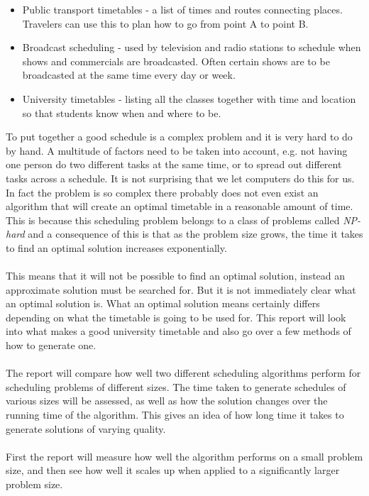 \documentclass[titlepage,a4paper]{article}
\begin{document}
\begin{itemize}

  \item Public transport timetables - a list of times and routes connecting places. Travelers can use this to plan how to go from point A to point B.
  \item Broadcast scheduling - used by television and radio stations to schedule when shows and commercials are broadcasted. Often certain shows are to be broadcasted at the same time every day or week.
  \item University timetables - listing all the classes together with time and location so that students know when and where to be. 

\end{itemize}
To put together a good schedule is a complex problem and it is very hard to do by hand. A multitude of factors need to be taken into account, e.g. not having one person do two different tasks at the same time, or to spread out different tasks across a schedule. It is not surprising that we let computers do this for us. In fact the problem is so complex there probably does not even exist an algorithm that will create an optimal timetable in a reasonable amount of time. This is because this scheduling problem belongs to a class of problems called \emph{NP-hard}\cite{guidedSearch09}  and a consequence of this is that as the problem size grows, the time it takes to find an optimal solution increases exponentially. \\\\
This means that it will not be possible to find an optimal solution, instead an approximate solution must be searched for. But it is not immediately clear what an optimal solution is. What an optimal solution means certainly differs depending on what the timetable is going to be used for. This report will look into what makes a good university timetable and also go over a few methods of how to generate one. \\\\
The report will compare how well two different scheduling algorithms perform for scheduling problems of different sizes. The time taken to generate schedules of various sizes will be assessed, as well as how the solution changes over the running time of the algorithm. This gives an idea of how long time it takes to generate solutions of varying quality. \\\\
First the report will measure how well the algorithm performs on a small problem size, and then see how well it scales up when applied to a significantly larger problem size.
\end{document}
